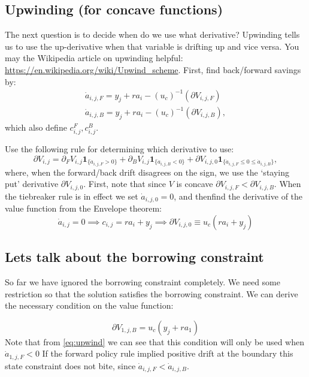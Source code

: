 \documentclass[12pt]{article}
\DeclareMathOperator{\1}{\mathbbm{1}}
\begin{document}
    \subsection{Upwinding (for concave functions)}
    The next question is to decide when do we use what derivative? Upwinding tells us to use the up-derivative when that variable is drifting up and vice versa. You may the Wikipedia article on upwinding helpful: \url{https://en.wikipedia.org/wiki/Upwind_scheme}. First, find back/forward savings by:
    \begin{equation}
    \begin{split}
    \dot a_{i,j,F} = y_j + r a_i -(u_c)^{-1}(\partial V_{i,j,F})   \\
    \dot a_{i,j,B} = y_j + r a_i -(u_c)^{-1}(\partial V_{i,j,B}),
    \end{split}
    \end{equation}
    which also define $c_{i,j}^F,c_{i,j}^B$. 
    
    Use the following rule for determining which derivative to use:
    \begin{equation}\label{eq:upwind}
    \partial V_{i,j}=\partial_F V_{i,j}\mathbf{1}_{\{\dot a_{i,j,F}>0\}} + \partial_B V_{i,j}\mathbf{1}_{\{\dot a_{i,j,B}<0\}} +  {\partial V_{i,j,0}}\mathbf{1}_{\{\dot a_{i,j,F}\le 0 \le \dot a_{i,j,B}\}},
    \end{equation}
    where, when the forward/back drift disagrees on the sign, we use the `staying put' derivative $\partial V_{i,j,0}$. First, note that since $V$ is concave $\partial V_{i,j,F}<\partial V_{i,j,B}$. When the tiebreaker rule is in effect we set $\dot a_{i,j,0}=0$, and thenfind the derivative of the value function from the Envelope theorem: \begin{equation}
    \dot a_{i,j} = 0 \implies c_{i,j} = r a_i + y_j \implies \partial    V_{i,j,0} \equiv u_c(r a_i+y_j)  
    \end{equation}
    
    \subsection{Lets talk about the borrowing constraint}
    \label{sec:borrowingconstr}
So far we have ignored the borrowing constraint completely. We need some restriction so that the solution satisfies the borrowing constraint. We can derive the necessary condition on the value function:

    \begin{equation*}
        \partial V_{1,j,B} = u_c(y_j + r a_1)
    \end{equation*}
    Note that from \eqref{eq:upwind} we can see that this condition will only be used when $\dot a_{1,j,F}<0$ If the forward policy rule implied positive drift at the boundary this state constraint does not bite, since $\dot a_{i,j,F}<\dot a_{i,j,B}$.
    
\end{document}
